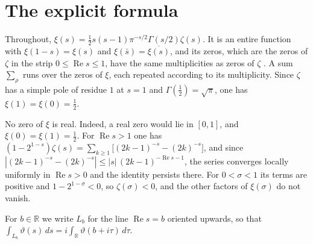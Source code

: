 \documentclass[11pt]{amsart}
\theoremstyle{remark}
\numberwithin{equation}{section}
\newcommand{\R}{\mathbb R}
\newcommand{\Rel}{\operatorname{Re}}
\begin{document}
\section{The explicit formula}
\label{sec:EF}

Throughout, $\xi(s)=\tfrac12s(s-1)\pi^{-s/2}\Gamma(s/2)\zeta(s)$.  It is an
entire function with $\xi(1-s)=\xi(s)$ and $\xi(\bar s)=\overline{\xi(s)}$,
and its zeros, which are the zeros of $\zeta$ in the strip
$0\le\Rel s\le1$, have the same multiplicities as zeros of $\zeta$
\cite[ch.~8 and~12]{Davenport}.  A sum $\sum_\rho$ runs over the zeros of
$\xi$, each repeated according to its multiplicity.  Since $\zeta$ has a
simple pole of residue $1$ at $s=1$ and $\Gamma(\frac12)=\sqrt\pi$, one has
$\xi(1)=\xi(0)=\tfrac12$.

No zero of $\xi$ is real.  Indeed, a real zero would lie in $[0,1]$, and
$\xi(0)=\xi(1)=\tfrac12$.  For $\Rel s>1$ one has
$(1-2^{1-s})\zeta(s)=\sum_{k\ge1}\bigl[(2k-1)^{-s}-(2k)^{-s}\bigr]$, and
since $|(2k-1)^{-s}-(2k)^{-s}|\le|s|\,(2k-1)^{-\Rel s-1}$, the series
converges locally uniformly in $\Rel s>0$ and the identity persists there.
For $0<\sigma<1$ its terms are positive and $1-2^{1-\sigma}<0$, so
$\zeta(\sigma)<0$, and the other factors of $\xi(\sigma)$ do not vanish.

For $b\in\R$ we write $L_b$ for the line $\Rel s=b$ oriented upwards, so
that $\int_{L_b}\vartheta(s)\,ds=i\int_\R\vartheta(b+i\tau)\,d\tau$.
\end{document}
